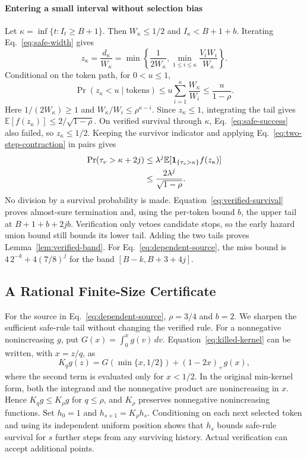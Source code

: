 \paragraph{Entering a small interval without selection bias}
Let $\kappa=\inf\{t:I_t\ge B+1\}$. Then $W_\kappa\le1/2$ and
$I_\kappa<B+1+b$. Iterating Eq.~\eqref{eq:safe-width} gives
\[
 z_\kappa=\frac{d_\kappa}{W_\kappa}
 =\min\left\{\frac1{2W_\kappa},
       \min_{1\le i\le\kappa}\frac{V_iW_i}{W_\kappa}\right\}.
\]
Conditional on the token path, for $0<u\le1$,
\[
 \Pr(z_\kappa<u\mid\text{tokens})
 \le u\sum_{i=1}^{\kappa}\frac{W_\kappa}{W_i}
 \le\frac{u}{1-\rho}.
\]
Here $1/(2W_\kappa)\ge1$ and $W_\kappa/W_i\le\rho^{\kappa-i}$. Since
$z_\kappa\le1$, integrating the tail gives
$\mathbb E[f(z_\kappa)]\le2/\sqrt{1-\rho}$. On verified survival through
$\kappa$, Eq.~\eqref{eq:safe-success} also failed, so $z_\kappa\le1/2$.
Keeping the survivor indicator and applying Eq.~\eqref{eq:two-step-contraction}
in pairs gives
\begin{align}
 \Pr(\tau_v>\kappa+2j)
 &\le\lambda^j\mathbb E[
    \mathbf1_{\{\tau_v>\kappa\}}f(z_\kappa)]\notag\\
 &\le\frac{2\lambda^j}{\sqrt{1-\rho}}.
 \label{eq:verified-survival}
\end{align}
No division by a survival probability is made. Equation~\eqref{eq:verified-survival}
proves almost-sure termination and, using the per-token bound $b$, the upper
tail at $B+1+b+2jb$. Verification only vetoes candidate stops, so the early
hazard union bound still bounds its lower tail. Adding the two tails proves
Lemma~\ref{lem:verified-band}. For Eq.~\eqref{eq:dependent-source}, the miss
bound is $4\,2^{-k}+4(7/8)^j$ for the band $[B-k,B+3+4j]$.

\subsection{A Rational Finite-Size Certificate}
\label{app:finite-certificate}

For the source in Eq.~\eqref{eq:dependent-source}, $\rho=3/4$ and $b=2$.
We sharpen the sufficient safe-rule tail without changing the verified rule.
For a nonnegative nonincreasing $g$, put $G(x)=\int_0^x g(v)\,dv$. Equation~\eqref{eq:killed-kernel}
can be written, with $x=z/q$, as
\[
 K_qg(z)=G(\min\{x,1/2\})+(1-2x)_+g(x),
\]
where the second term is evaluated only for $x<1/2$. In the original
min-kernel form, both the integrand and the nonnegative product are
nonincreasing in $x$. Hence $K_qg\le K_\rho g$ for $q\le\rho$, and $K_\rho$
preserves nonnegative nonincreasing functions. Set $h_0=1$ and
$h_{s+1}=K_\rho h_s$.
Conditioning on each next selected token and using its independent uniform
position shows that $h_s$ bounds safe-rule survival for $s$ further steps
from any surviving history. Actual verification can accept additional points.

